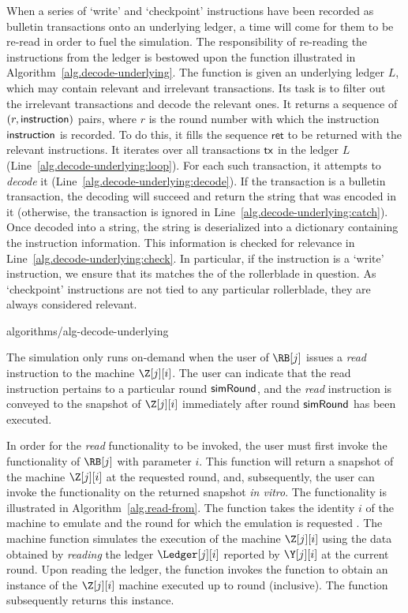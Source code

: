 When a series of `write' and `checkpoint' instructions have been recorded as bulletin
transactions onto an underlying ledger, a time will come for them to be re-read in order to fuel
the simulation. The responsibility of re-reading the instructions from the ledger is
bestowed upon the function \decodeUnderlying illustrated in
Algorithm~\ref{alg.decode-underlying}. The function is given an underlying ledger $L$,
which may contain relevant and irrelevant transactions.
Its task is to filter out the irrelevant transactions and decode the relevant ones.
It returns a sequence of $(r, \textsf{instruction})$ pairs, where $r$ is the round number
with which the instruction $\textsf{instruction}$ is recorded.
To do this, it fills the sequence $\textsf{ret}$ to be returned with the
relevant instructions. It iterates over all transactions $\textsf{tx}$ in the ledger $L$
(Line~\ref{alg.decode-underlying:loop}). For each such transaction, it attempts
to \emph{decode} it (Line~\ref{alg.decode-underlying:decode}). If the transaction
is a bulletin transaction, the decoding will succeed and return the string that
was encoded in it (otherwise, the transaction is ignored in
Line~\ref{alg.decode-underlying:catch}). Once decoded into a string, the string
is deserialized into a dictionary containing the instruction information. This
information is checked for relevance in Line~\ref{alg.decode-underlying:check}.
In particular, if the instruction is a `write' instruction, we ensure that its
\sid matches the \sid of the rollerblade in question. As `checkpoint' instructions
are not tied to any particular rollerblade, they are always considered relevant.

{algorithms/alg-decode-underlying}

The simulation only runs
on-demand when the user of $\RB[j]$ issues a \emph{read} instruction to the machine
$\Z[j][i]$. The user can indicate that the read instruction pertains to a particular
round $\textsf{simRound}$, and the \emph{read} instruction is conveyed to the snapshot
of $\Z[j][i]$ immediately after round $\textsf{simRound}$ has been executed.

In order for the \emph{read} functionality to be invoked, the user must first
invoke the \emulateMachine functionality of $\RB[j]$ with parameter $i$.
This function will return a snapshot of the machine $\Z[j][i]$ at the requested
round, and, subsequently, the user can invoke the \lread functionality on
the returned snapshot \emph{in vitro}.
The \emulateMachine functionality is illustrated in Algorithm~\ref{alg.read-from}.
The \emulateMachine function takes the identity $i$ of the machine to emulate
and the round for which the emulation is requested
\simulationRound.
The \emulateMachine machine function simulates the execution of the machine
$\Z[j][i]$ using the data obtained by \emph{reading} the ledger $\Ledger[j][i]$
reported by $\Y[j][i]$ at the current round. Upon reading the ledger,
the \emulateMachine function invokes the \simulate function to obtain an instance
of the $\Z[j][i]$ machine executed up to round \simulationRound (inclusive).
The \emulateMachine function subsequently returns this instance.

